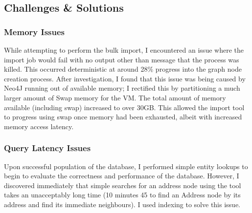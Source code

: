 \subsection{Challenges \& Solutions}
\subsubsection{Memory Issues}
While attempting to perform the bulk import, I encountered an issue where the import job would fail with no output other than message that the process was killed. This occurred deterministic at around 28\% progress into the graph node creation process. After investigation, I found that this issue was being caused by Neo4J running out of available memory; I rectified this by partitioning a much larger amount of Swap memory for the VM. The total amount of memory available (including swap) increased to over 30GB. This allowed the import tool to progress using swap once memory had been exhausted, albeit with increased memory access latency.

\subsubsection{Query Latency Issues} 
Upon successful population of the database, I performed simple entity lookups to begin to evaluate the correctness and performance of the database. However, I discovered immediately that simple searches for an address node using the tool takes an unacceptably long time (10 minutes 45 to find an Address node by its address and find its immediate neighbours). I used indexing to solve this issue. 

